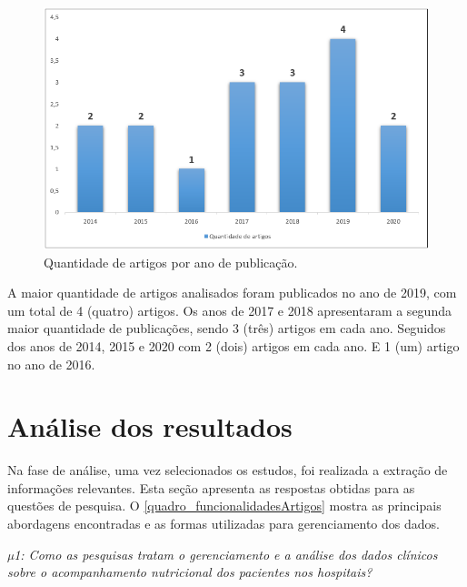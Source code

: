 \begin{figure}[htb]
	\caption{\label{fig_graficoQuantidadeArtigoAno}Quantidade de artigos por ano de publicação.}
	\begin{center}
	    \includegraphics[scale=0.6]{Imagens/grafico - quantidade de artigos por ano de publicacao.png}
	\end{center}
\end{figure}

A maior quantidade de artigos analisados foram publicados no ano de 2019, com um total de 4 (quatro) artigos. Os anos de 2017 e 2018 apresentaram a segunda maior quantidade de publicações, sendo 3 (três) artigos em cada ano. Seguidos dos anos de 2014, 2015 e 2020 com 2 (dois) artigos em cada ano. E 1 (um) artigo no ano de 2016.

\section{Análise dos resultados}
Na fase de análise, uma vez selecionados os estudos, foi realizada a extração de informações relevantes. Esta seção apresenta as respostas obtidas para as questões de pesquisa. O \autoref{quadro_funcionalidadesArtigos} mostra as principais abordagens encontradas e as formas utilizadas para gerenciamento dos dados.

\textit{µ1: Como as pesquisas tratam o gerenciamento e a análise dos dados clínicos sobre o acompanhamento nutricional dos pacientes nos hospitais?}

